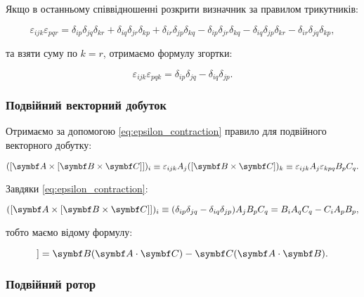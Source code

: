 Якщо в останньому співвідношенні розкрити визначник за правилом трикутників:

\begin{equation*}
\varepsilon_{ijk} \varepsilon_{pqr} = \delta_{ip} \delta_{jq} \delta_{kr} + \delta_{iq} \delta_{jr} \delta_{kp} + \delta_{ir} \delta_{jp} \delta_{kq} -
\delta_{ip} \delta_{jr} \delta_{kq} - \delta_{iq} \delta_{jp} \delta_{kr} - \delta_{ir} \delta_{jq} \delta_{kp},
\end{equation*}

та взяти суму по \( k = r \), отримаємо формулу згортки:

\begin{equation}
\varepsilon_{ijk} \varepsilon_{pqk} = \delta_{ip} \delta_{jq} - \delta_{iq} \delta_{jp}.
\label{eq:epsilon_contraction}
\end{equation}

\subsubsection{Подвійний векторний добуток}

Отримаємо за допомогою \eqref{eq:epsilon_contraction} правило для подвійного векторного добутку:

\begin{equation*}
([\vect{A} \times [\vect{B} \times \vect{C}]])_i \equiv \varepsilon_{ijk} A_j ([\vect{B} \times \vect{C}])_k \equiv \varepsilon_{ijk} A_j
\varepsilon_{kpq} B_p C_q.
\end{equation*}

Завдяки \eqref{eq:epsilon_contraction}:

\begin{equation*}
([\vect{A} \times [\vect{B} \times \vect{C}]])_i \equiv (\delta_{ip} \delta_{jq} - \delta_{iq} \delta_{jp}) A_j B_p C_q = B_i A_q C_q - C_i A_p B_p,
\end{equation*}

тобто маємо відому формулу:

\begin{equation*}
[\vect{A} \times [\vect{B} \times \vect{C}]] = \vect{B}(\vect{A} \cdot \vect{C}) - \vect{C}(\vect{A} \cdot \vect{B}).
\end{equation*}


\subsubsection{Подвійний ротор}

